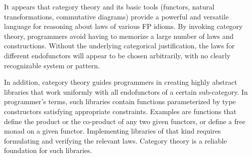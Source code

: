 It appears that category theory and its basic tools (functors, natural
transformations, commutative diagrams) provide a powerful and versatile
language for reasoning about laws of various FP idioms. By invoking
category theory, programmers avoid having to memorize a large number
of laws and constructions. Without the underlying categorical justification,
the laws for different endofunctors will appear to be chosen arbitrarily,
with no clearly recognizable system or pattern.

In addition, category theory guides programmers in creating highly
abstract libraries that work uniformly with all endofunctors of a
certain sub-category. In programmer\textsf{'}s terms, such libraries contain
functions parameterized by type constructors satisfying appropriate
constraints. Examples are functions that define the product or the
co-product of any two given functors, or define a free monad on a
given functor. Implementing libraries of that kind requires formulating
and verifying the relevant laws. Category theory is a reliable foundation
for such libraries.
